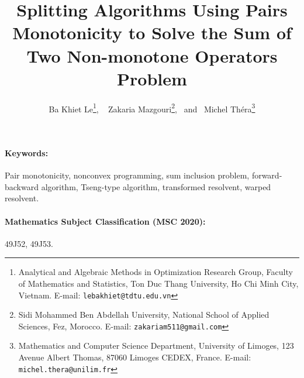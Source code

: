 \documentclass[11pt]{article}
\theoremstyle{definition}
\theoremstyle{definition}
\theoremstyle{definition}
\begin{document}
\title{Splitting Algorithms Using  Pairs Monotonicity to Solve the Sum of Two Non-monotone Operators Problem}

\author{
Ba Khiet Le\thanks{Analytical and Algebraic Methods in Optimization Research Group, Faculty of Mathematics and Statistics, Ton
Duc Thang University, Ho Chi Minh City, Vietnam. E-mail: \texttt{lebakhiet@tdtu.edu.vn}}, 
~
Zakaria Mazgouri\thanks{Sidi Mohammed Ben Abdellah University, 
National School of Applied Sciences, Fez, Morocco. %
E-mail: \texttt{zakariam511@gmail.com}}, 
~and~ 
Michel Th\' era\thanks{Mathematics and Computer Science Department, University of Limoges, 123 Avenue Albert Thomas,
87060 Limoges CEDEX, France. E-mail: \texttt{michel.thera@unilim.fr}}
}




\maketitle


\begin{abstract}
\end{abstract}


\paragraph{Keywords:}
Pair monotonicity, 
nonconvex programming,  sum inclusion problem, forward-backward algorithm, Tseng-type algorithm,  transformed resolvent, warped resolvent.




\paragraph{Mathematics Subject Classification (MSC 2020):}
 49J52, 49J53.  
\end{document}
